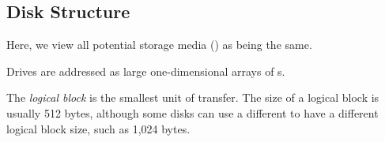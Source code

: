 \subsection{Disk Structure}\label{subsec:Disk_Structure}
Here, we view all potential storage media () as being the same.

Drives are addressed as large one-dimensional arrays of s.

\begin{definition}\label{def:Logical_Block}
  The \emph{logical block} is the smallest unit of transfer.
  The size of a logical block is usually 512 bytes, although some disks can use a different  to have a different logical block size, such as 1,024 bytes.
\end{definition}


